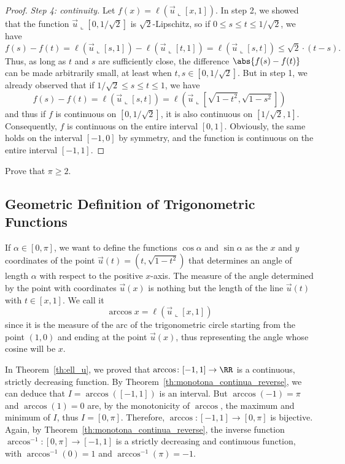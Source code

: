 \begin{proof}
\emph{Step 4: continuity.}
Let $f(x)= \ell(\vec u \llcorner[x,1])$. In step 2, we showed that the function
$\vec u \llcorner [0,1/\sqrt 2]$ is $\sqrt 2$-Lipschitz, so if $0\le s \le t \le
1/\sqrt 2$, we have
\[
f(s)-f(t) = \ell(\vec u\llcorner [s,1]) - \ell(\vec u\llcorner[t,1])
= \ell(\vec u \llcorner[s,t]) 
\le \sqrt 2\cdot (t-s).
\]
Thus, as long as $t$ and $s$ are sufficiently close, the difference
$\abs{f(s)-f(t)}$ can be made arbitrarily small, at least when $t,s \in
[0,1/\sqrt 2]$. But in step 1, we already observed that if $1/\sqrt 2 \le s \le
t \le 1$, we have
\[
f(s)-f(t) 
= \ell(\vec u \llcorner [s,t])
= \ell(\vec u \llcorner [\sqrt{1-t^2},\sqrt{1-s^2}])  
\]
and thus if $f$ is continuous on $[0,1/\sqrt 2]$, it is also continuous on
$[1/\sqrt 2, 1]$. Consequently, $f$ is continuous on the entire interval
$[0,1]$. Obviously, the same holds on the interval $[-1,0]$ by symmetry, and the
function is continuous on the entire interval $[-1,1]$.
\end{proof}

\begin{exercise}
Prove that $\pi\ge 2$.
\end{exercise}

\subsection{Geometric Definition of Trigonometric Functions}
If $\alpha\in [0,\pi]$, we want to define the functions $\cos \alpha$ and $\sin
\alpha$ as the $x$ and $y$ coordinates of the point $\vec u(t)=(t,\sqrt{1-t^2})$
that determines an angle of length $\alpha$ with respect to the positive
$x$-axis. The measure of the angle determined by the point with coordinates
$\vec u(x)$ is nothing but the length of the line $\vec u(t)$ with $t\in[x,1]$.
We call it
\[
  \arccos x = \ell(\vec u\llcorner [x,1])
\] 
since it is the measure of the arc of the trigonometric circle starting from the
point $(1,0)$ and ending at the point $\vec u(x)$, thus representing the angle
whose cosine will be $x$.

In Theorem~\ref{th:ell_u}, we proved that $\arccos\colon [-1,1]\to \RR$ is a
continuous, strictly decreasing function. By
Theorem~\ref{th:monotona_continua_reverse}, we can deduce that $I =
\arccos([-1,1])$ is an interval. But $\arccos(-1) = \pi$ and $\arccos(1)=0$ are,
by the monotonicity of $\arccos$, the maximum and minimum of $I$, thus
$I=[0,\pi]$. Therefore, $\arccos\colon [-1,1]\to [0,\pi]$ is bijective. Again,
by Theorem~\ref{th:monotona_continua_reverse}, the inverse function
$\arccos^{-1}\colon [0,\pi]\to[-1,1]$ is a strictly decreasing and continuous
function, with $\arccos^{-1}(0) = 1$ and $\arccos^{-1}(\pi)=-1$.


